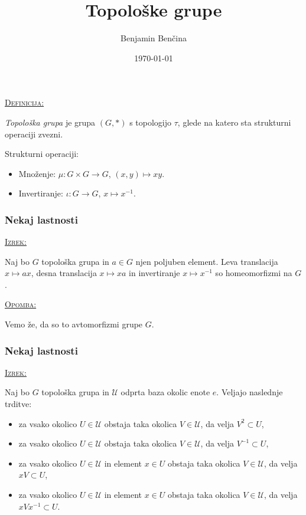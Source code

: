 \documentclass[a4paper, 12pt]{beamer}
\title{Topološke grupe}
\author{Benjamin Benčina}
\institute[FMF]{Fakulteta za matematiko in fiziko}
\date{\today}
\newenvironment{matematika}[1]{
\textcolor{bostonuniversityred}{\underline{\textsc{#1:}}}
}{
}
\begin{document}
	
\titlepage
	
\begin{frame}
\begin{matematika}{Definicija}
	\emph{Topološka grupa} je grupa $(G, *)$ s topologijo $\tau$, glede na katero sta strukturni operaciji zvezni.
\end{matematika}
\newline
\newline
Strukturni operaciji:
\begin{itemize}[label=]
	\item Množenje: $\mu : G \times G \to G$, $(x, y) \mapsto xy$.
	\item Invertiranje: $\iota : G \to G$, $x \mapsto x^{-1}$.
\end{itemize}

\end{frame}

\begin{frame}
\frametitle{Nekaj lastnosti}
\begin{matematika}{Izrek}
Naj bo $G$ topološka grupa in $a \in G$ njen poljuben element. Leva translacija $x \mapsto ax$, desna translacija $x \mapsto xa$ in invertiranje $x \mapsto x^{-1}$ so homeomorfizmi na $G$.
\end{matematika} \newline

\begin{matematika}{Opomba}
Vemo že, da so to avtomorfizmi grupe $G$.
\end{matematika}
\end{frame}

\begin{frame}
\frametitle{Nekaj lastnosti}
\begin{matematika}{Izrek}
Naj bo $G$ topološka grupa in $\mathcal{U}$ odprta baza okolic enote $e$. Veljajo naslednje trditve:
\begin{itemize}[label=]
	\item za vsako okolico $U \in \mathcal{U}$ obstaja taka okolica $V \in \mathcal{U}$, da velja $V^2 \subset U$,
	\item za vsako okolico $U \in \mathcal{U}$ obstaja taka okolica $V \in \mathcal{U}$, da velja $V^{-1} \subset U$,
	\item za vsako okolico $U \in \mathcal{U}$ in element $x \in U$ obstaja taka okolica $V \in \mathcal{U}$, da velja $xV \subset U$,
	\item za vsako okolico $U \in \mathcal{U}$ in element $x \in U$ obstaja taka okolica $V \in \mathcal{U}$, da velja $xVx^{-1} \subset U$.
\end{itemize}
\end{matematika}
\end{frame}
\end{document}
